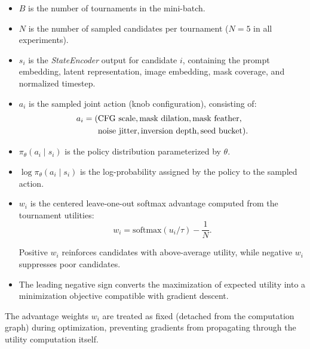 \begin{itemize}
\item
$B$ is the number of tournaments in the mini-batch.

\item
$N$ is the number of sampled candidates per tournament
($N=5$ in all experiments).

\item
$s_i$ is the \textit{StateEncoder} output for candidate $i$,
containing the prompt embedding, latent representation,
image embedding, mask coverage, and normalized timestep.

\item
$a_i$ is the sampled joint action (knob configuration),
consisting of:
\begin{equation}
\begin{aligned}
a_i =
(
&\text{CFG scale},
\text{mask dilation},
\text{mask feather}, \\
&\text{noise jitter},
\text{inversion depth},
\text{seed bucket}
).\notag
\end{aligned}
\end{equation}

\item
$\pi_\theta(a_i \mid s_i)$ is the policy distribution
parameterized by $\theta$.

\item
$\log \pi_\theta(a_i \mid s_i)$ is the log-probability
assigned by the policy to the sampled action.

\item
$w_i$ is the centered leave-one-out softmax advantage
computed from the tournament utilities:
\[
w_i
=
\mathrm{softmax}(u_i / \tau)
-
\frac{1}{N}.
\]

Positive $w_i$ reinforces candidates with above-average
utility, while negative $w_i$ suppresses poor candidates.

\item
The leading negative sign converts the maximization of
expected utility into a minimization objective compatible
with gradient descent.

\end{itemize}

The advantage weights $w_i$ are treated as fixed
(detached from the computation graph) during optimization,
preventing gradients from propagating through the utility
computation itself.

